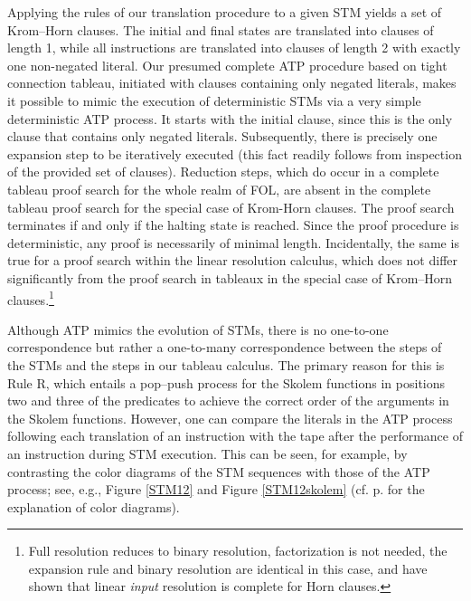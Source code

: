 \documentclass[%
  manuscript=article,   %
  year=2024,
  volume=77,
  doi=00000.000,
]{zfn}
\begin{document}
Applying the rules of our translation procedure to a given STM yields a set of Krom--Horn clauses. The initial and final states are translated into clauses of length 1, while all instructions are translated into clauses of length 2 with exactly one non-negated literal. Our presumed complete ATP procedure based on tight connection tableau, initiated with clauses containing only negated literals, makes it possible to mimic the execution of deterministic STMs via a very simple deterministic ATP process. It starts with the initial clause, since this is the only clause that contains only negated literals. Subsequently, there is precisely one expansion step to be iteratively executed (this fact readily follows from inspection of the provided set of clauses).
Reduction steps, which do occur in a complete tableau proof search for the whole realm of FOL, are absent in the complete tableau proof search for the special case of Krom-Horn clauses.
The proof search terminates if and only if the halting state is reached. Since the proof procedure is deterministic, any proof is necessarily of minimal length. Incidentally, the same is true for a proof search within the linear resolution calculus, which does not differ significantly from the proof search in tableaux in the special case of Krom--Horn clauses.\footnote{Full resolution reduces to binary resolution, factorization is not needed, the expansion rule and binary resolution are identical in this case, and \parencite{Henschen} have shown that linear \emph{input} \label{resolu} resolution is complete for Horn clauses.}

Although ATP mimics the evolution of STMs, there is no one-to-one correspondence but rather a one-to-many correspondence between the steps of the STMs and the steps in our tableau calculus. The primary reason for this is Rule R, which entails a pop--push process for the Skolem functions in positions two and three of the predicates to achieve the correct order of the arguments in the Skolem functions.
However, one can compare the literals in the ATP process following each translation of an instruction with the tape after the performance of an instruction during STM execution. This can be seen, for example, by contrasting the color diagrams of the STM sequences with those of the ATP process; see, e.g.,
Figure \ref{STM12} and Figure \ref{STM12skolem} (cf. p. \pageref{colordia} for the explanation of color diagrams).
\end{document}
